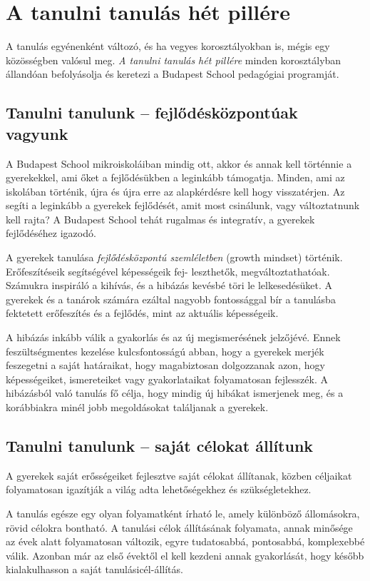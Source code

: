 \section{A tanulni tanulás hét pillére}
A tanulás egyénenként változó, és ha vegyes korosztályokban is, mégis egy közösségben valósul meg. \emph{A tanulni tanulás hét pillére} minden korosztályban állandóan befolyásolja és keretezi a Budapest School pedagógiai programját.

\subsection{Tanulni tanulunk -- fejlődésközpontúak vagyunk}
A Budapest School mikroiskoláiban mindig ott, akkor és annak kell történnie a gyerekekkel, ami őket a fejlődésükben a leginkább támogatja. Minden, ami az iskolában történik, újra és újra erre az alapkérdésre kell hogy visszatérjen. Az segíti a leginkább a gyerekek fejlődését, amit most csinálunk, vagy változtatnunk kell rajta? A Budapest School tehát rugalmas és integratív, a gyerekek fejlődéséhez igazodó.

A gyerekek tanulása \emph{fejlődésközpontú szemléletben}
\citep{growthmindset}
(growth mindset) történik.  Erőfeszítéseik segítségével képességeik
fej-
leszthetők, megváltoztathatóak. Számukra inspiráló a kihívás, és a hibázás kevésbé töri le lelkesedésüket. A gyerekek és a tanárok számára ezáltal nagyobb fontossággal bír a tanulásba fektetett erőfeszítés és a fejlődés, mint az aktuális képességeik.

A hibázás inkább válik a gyakorlás és az új megismerésének jelzőjévé. Ennek feszültségmentes kezelése kulcsfontosságú abban, hogy a gyerekek merjék feszegetni a saját határaikat, hogy magabiztosan dolgozzanak azon, hogy képességeiket, ismereteiket vagy gyakorlataikat folyamatosan fejlesszék. A hibázásból való tanulás fő célja, hogy mindig új hibákat ismerjenek meg, és a korábbiakra minél jobb megoldásokat találjanak a gyerekek.

\subsection{Tanulni tanulunk -- saját célokat állítunk}
A gyerekek saját erősségeiket fejlesztve saját célokat állítanak, közben céljaikat folyamatosan igazítják a világ adta lehetőségekhez és szükségletekhez.

A tanulás egésze egy olyan folyamatként írható le, amely különböző állomásokra, rövid célokra bontható. A tanulási célok állításának folyamata, annak minősége az évek alatt folyamatosan változik, egyre tudatosabbá, pontosabbá, komplexebbé válik. Azonban már az első évektől el kell kezdeni annak gyakorlását, hogy később kialakulhasson a saját tanulásicél-állítás.


